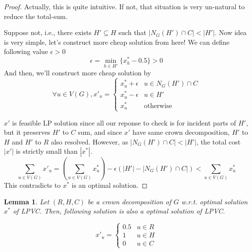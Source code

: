 \documentclass[12pt, a4paper, openany, twoside]{book}
\newtheorem{lem}[thm]{Lemma}
\theoremstyle{definition}
\theoremstyle{remark}
\theoremstyle{plain}
\numberwithin{equation}{section}
\begin{document}
\begin{proof}
    
Actually, this is quite intuitive. If not, that situation is very un-natural to reduce the total-sum. 

Suppose not, i.e., there exists $H' \subseteq H$ such that $|N_G(H') \cap C| < |H'|$. 
Now idea is very simple, let's construct more cheap solution from here! 
We can define following value $\epsilon > 0$ 
\[\epsilon = \min_{h \in H'} \{x^*_h - 0.5\} > 0\]
And then, we'll construct more cheap solution by 
\[\forall u \in V(G), x'_u = \begin{cases}
    x^*_u + \epsilon & u \in N_G(H') \cap C \\
    x^*_u - \epsilon & u \in H' \\
    x^*_u & \text{otherwise}
\end{cases}\]

$x'$ is feasible LP solution since all our reponse to check is for incident parts of $H'$, but it preserves 
$H'$ to $C$ sum, and since $x'$ have same crown decomposition, $H'$ to $H$ and $H'$ to $R$ also resolved. However, as 
$|N_G(H') \cap C| < |H'|$, the total cost $|x'|$ is strictly small than $|x^*|$. 
\[\sum_{u \in V(G)} x'_u = \left(\sum_{u \in V(G)} x^*_u \right) - \epsilon(|H'| - |N_G(H') \cap C|) < \sum_{u \in V(G)} x^*_u\]
This contradicts to $x^*$ is an optimal solution. 

\end{proof}

\begin{lem}
    
Let $(R, H, C)$ be a crown decomposition of $G$ w.r.t. optimal solution $x^*$ of \textsc{LPVC}. 
Then, following solution is also a optimal solution of \textsc{LPVC}. 

\[x'_u = \begin{cases}
    0.5 & u \in R \\
    1 & u \in H \\
    0 & u \in C
\end{cases}\]

\end{lem}
\end{document}
